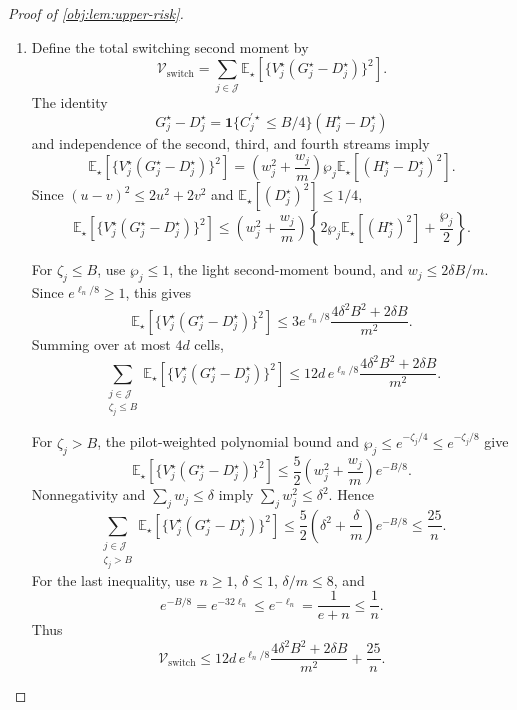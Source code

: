 \documentclass[11pt]{article}
\begin{document}
\begin{proof}[Proof of \cref{obj:lem:upper-risk}]
\begin{enumerate}
The second and fourth streams are independent. Their first and second moments consequently give
\[
\begin{aligned}
\operatorname{Var}_\star(V_j^\star D_j^\star)
&=\left(w_j^2+\frac{w_j}{m}\right)
\operatorname{Var}_\star(D_j^\star)
+\frac{w_j}{m}\{\mathbb E_\star[D_j^\star]\}^2\\
&\le\frac{4w_j^2}{1+\zeta_j}
+\frac{17w_j}{4m},
\end{aligned}
\]
where \(\{\mathbb E_\star[D_j^\star]\}^2\le1/4\).
Also,
\[
\frac{w_j^2}{1+mt_j}
\le\frac{2\delta}{m}w_j,
\qquad
\sum_{j\in\mathcal J}\frac{w_j^2}{1+mt_j}
\le\frac{2\delta^2}{m}.
\]
Since \(\delta+2\delta^2\le1\),
\[
\sum_{j\in\mathcal J}
\left(\frac{w_j}{m}+\frac{w_j^2}{1+mt_j}\right)
\le\frac1m.
\]
Replacing the coefficient \(4\) of the nonnegative quadratic term by \(17/4\) therefore yields
\[
\sum_{j\in\mathcal J}
\operatorname{Var}_\star(V_j^\star D_j^\star)
\le\frac{17}{4m}
=\frac{34}{n}.
\]

\item Define the total switching second moment by
\[
\mathcal V_{\mathrm{switch}}
=
\sum_{j\in\mathcal J}
\mathbb E_\star[
\{V_j^\star(G_j^\star-D_j^\star)\}^2].
\]
The identity
\[
G_j^\star-D_j^\star
=\mathbf1\{C_j^{\prime\star}\le B/4\}(H_j^\star-D_j^\star)
\]
and independence of the second, third, and fourth streams imply
\[
\mathbb E_\star[
\{V_j^\star(G_j^\star-D_j^\star)\}^2]
=
\left(w_j^2+\frac{w_j}{m}\right)\wp_j
\mathbb E_\star[(H_j^\star-D_j^\star)^2].
\]
Since \((u-v)^2\le2u^2+2v^2\) and
\(\mathbb E_\star[(D_j^\star)^2]\le1/4\),
\[
\mathbb E_\star[
\{V_j^\star(G_j^\star-D_j^\star)\}^2]
\le
\left(w_j^2+\frac{w_j}{m}\right)
\left\{2\wp_j\mathbb E_\star[(H_j^\star)^2]+\frac{\wp_j}{2}\right\}.
\]

For \(\zeta_j\le B\), use \(\wp_j\le1\), the light second-moment bound, and
\(w_j\le2\delta B/m\). Since \(e^{\ell_n/8}\ge1\), this gives
\[
\mathbb E_\star[
\{V_j^\star(G_j^\star-D_j^\star)\}^2]
\le
3e^{\ell_n/8}
\frac{4\delta^2B^2+2\delta B}{m^2}.
\]
Summing over at most \(4d\) cells,
\[
\sum_{\substack{j\in\mathcal J\\\zeta_j\le B}}
\mathbb E_\star[
\{V_j^\star(G_j^\star-D_j^\star)\}^2]
\le
12d\,e^{\ell_n/8}
\frac{4\delta^2B^2+2\delta B}{m^2}.
\]

For \(\zeta_j>B\), the pilot-weighted polynomial bound and
\(\wp_j\le e^{-\zeta_j/4}\le e^{-\zeta_j/8}\) give
\[
\mathbb E_\star[
\{V_j^\star(G_j^\star-D_j^\star)\}^2]
\le
\frac52\left(w_j^2+\frac{w_j}{m}\right)e^{-B/8}.
\]
Nonnegativity and \(\sum_jw_j\le\delta\) imply
\(\sum_jw_j^2\le\delta^2\). Hence
\[
\sum_{\substack{j\in\mathcal J\\\zeta_j>B}}
\mathbb E_\star[
\{V_j^\star(G_j^\star-D_j^\star)\}^2]
\le\frac52\left(\delta^2+\frac{\delta}{m}\right)e^{-B/8}
\le\frac{25}{n}.
\]
For the last inequality, use \(n\ge1\), \(\delta\le1\),
\(\delta/m\le8\), and
\[
e^{-B/8}=e^{-32\ell_n}\le e^{-\ell_n}
=\frac1{e+n}\le\frac1n.
\]
Thus
\[
\mathcal V_{\mathrm{switch}}
\le
12d\,e^{\ell_n/8}
\frac{4\delta^2B^2+2\delta B}{m^2}
+\frac{25}{n}.
\]


\end{enumerate}
\end{proof}
\end{document}
